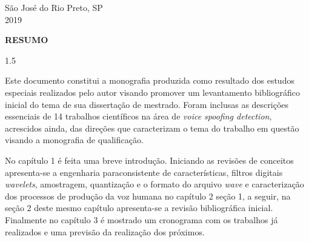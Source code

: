\documentclass[a4paper,12pt,openright,oneside]{book}
\newenvironment{myenv}[1]
  {\begin{spacing}{#1}}
  {\end{spacing}}
\begin{document}
	\begin{center}
		São José do Rio Preto, SP  \\ \vspace{1.0pt}
		2019
	\end{center}


	\setlength{\parindent}{0pt}
	\newpage \thispagestyle{empty}
	\vspace{1.5cm}
	\fontsize{12}{\baselineskip} \selectfont

	\begin{center}
		{\huge{\textbf{RESUMO}}}
	\end{center}

	\begin{myenv}{1.5}
		\fontsize{12}{\baselineskip} \selectfont \onehalfspacing
		\par \null
		\par \null
		\par Este documento constitui a monografia produzida como resultado dos estudos especiais realizados pelo autor visando promover um levantamento bibliográfico inicial do tema de sua dissertação de mestrado. Foram inclusas as descrições essenciais de 14 trabalhos científicos na área de \textit{voice spoofing detection}, acrescidos ainda, das direções que caracterizam o tema do trabalho em questão visando a monografia de qualificação.
		
		\par No capítulo 1 é feita uma breve introdução. Iniciando as revisões de conceitos apresenta-se a engenharia paraconsistente de características, filtros digitais \textit{wavelets}, amostragem,  quantização e o formato do arquivo \textit{wave} e caracterização dos processos de produção da voz humana no capítulo 2 seção 1, a seguir, na seção 2 deste mesmo capítulo apresenta-se a revisão bibliográfica inicial. Finalmente no capítulo 3 é mostrado um cronograma com os trabalhos já realizados e uma previsão da realização dos próximos.
		
	\end{myenv}

	\cleardoublepage
	\listoffigures
	
	\cleardoublepage
	\listoftables
	\frontmatter
	
	\def\contentsname{Sumário} 
	\tableofcontents
	\cleardoublepage
	
\end{document}
